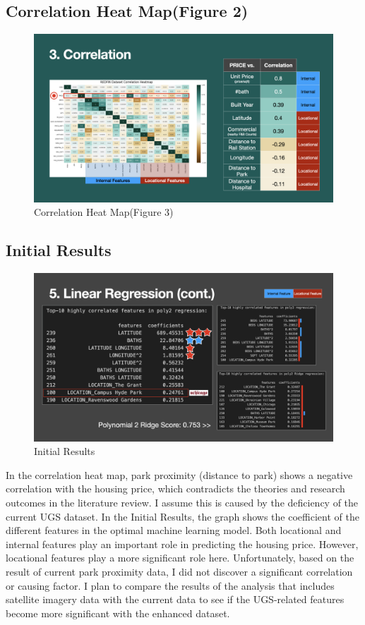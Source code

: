 \documentclass{article}
\begin{document}
\subsection*{Correlation Heat Map(Figure 2)}
\begin{figure}[h]
  \centering
  \includegraphics[width=\textwidth]{Visual/heatmap.jpeg}
  \caption{Correlation Heat Map(Figure 3)}
\end{figure}

\subsection*{Initial Results}
\begin{figure}[h]
  \centering
  \includegraphics[width=\textwidth]{Visual/results.jpeg}
  \caption{Initial Results}
\end{figure}

In the correlation heat map, park proximity (distance to park) shows a negative correlation with the housing price, which contradicts the theories and research outcomes in the literature review. I assume this is caused by the deficiency of the current UGS dataset. In the Initial Results, the graph shows the coefficient of the different features in the optimal machine learning model. Both locational and internal features play an important role in predicting the housing price. However, locational features play a more significant role here. Unfortunately, based on the result of current park proximity data, I did not discover a significant correlation or causing factor. I plan to compare the results of the analysis that includes satellite imagery data with the current data to see if the UGS-related features become more significant with the enhanced dataset.
\end{document}
